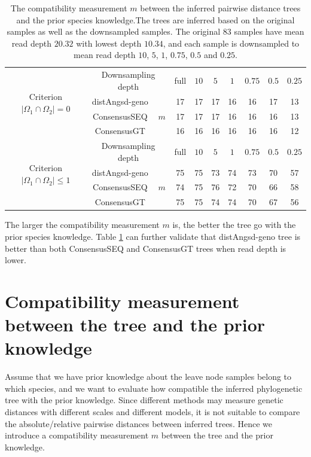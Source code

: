 \documentclass{article}
\begin{document}
\begin{table}[ht]
    \centering
    \begin{tabular}{|c|c|c|ccccccc|}
     \hline
     \multirow{4}{*}{Criterion $|\Omega_1\cap \Omega_2|=0$}& \multicolumn{2}{c|}{Downsampling depth} & full & $10$ & $5$ & $1$ & $0.75$ & $0.5$ & $0.25$\\
      \cline{2-10}
      & distAngsd-geno & \multirow{3}{*}{$m$} & 17 & 17 & 17 & 16 & 16 & 17 & 13 \\
      & ConsensusSEQ & & 17 & 17 & 17 & 16 & 16 & 16 & 13\\
      & ConsensusGT & & 16 & 16 & 16 & 16 & 16 & 16 & 12\\
      \hline
      \multirow{4}{*}{Criterion $|\Omega_1\cap \Omega_2|\leq 1$} &\multicolumn{2}{c|}{Downsampling depth} & full & $10$ & $5$ & $1$ & $0.75$ & $0.5$ & $0.25$\\
      \cline{2-10}
       & distAngsd-geno &\multirow{3}{*}{$m$} & 75 & 75 & 73 & 74 & 73 & 70 & 57 \\
      & ConsensusSEQ & & 74 & 75 & 76 & 72 & 70 & 66 & 58\\
      & ConsensusGT & & 75 & 75 & 74 & 74 & 70 & 67 & 56\\
    \hline
      \end{tabular}
    \caption{The compatibility measurement $m$ between the inferred pairwise distance trees and the prior species knowledge.The trees are inferred based on the original samples as well as the downsampled samples. The original 83 samples have mean read depth $20.32$ with lowest depth $10.34$, and each sample is downsampled to mean read depth $10$, $5$, $1$, $0.75$, $0.5$ and $0.25$.}
    \label{tab:DownsamplingExperimentalResults}
\end{table}

The larger the compatibility measurement $m$ is, the better the tree go with the prior species knowledge. Table \ref{tab:DownsamplingExperimentalResults} can further validate that distAngsd-geno tree is better than both ConsensusSEQ and ConsensusGT trees when read depth is lower.

\section{Compatibility measurement between the tree and the prior knowledge}
Assume that we have prior knowledge about the leave node samples belong to which species, and we want to evaluate how compatible the inferred phylogenetic tree with the prior knowledge. Since different methods may measure genetic distances with different scales and different models, it is not suitable to compare the absolute/relative pairwise distances between inferred trees. Hence we introduce a compatibility measurement $m$ between the tree and the prior knowledge.
\end{document}
